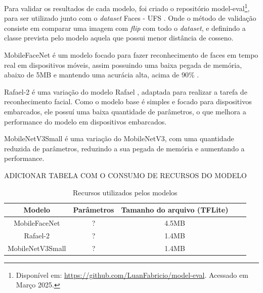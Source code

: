 Para validar os resultados de cada modelo, foi criado o repositório model-eval\footnote{
Disponível em: \url{https://github.com/LuanFabricio/model-eval}. Acessado em Março 2025.}, para ser utilizado junto com o
\textit{dataset} Faces - UFS \cite{leandro}.
Onde o método de validação consiste em comparar uma imagem com \textit{flip} com todo o \textit{dataset}, e definindo
a classe prevista pelo modelo aquela que possui menor distância de cosseno.

MobileFaceNet é um modelo focado para fazer reconhecimento de faces em tempo real em dispositivos móveis,
assim possuindo uma baixa pegada de memória, abaixo de 5MB e mantendo uma acurácia alta, acima de 90\% \cite{leandro}.

Rafael-2 é uma variação do modelo Rafael \cite{rafael}, adaptada para realizar a tarefa de reconhecimento facial.
Como o modelo base é simples e focado para dispositivos embarcados, ele possuí uma baixa quantidade de parâmetros,
 o que melhora a performance do modelo em dispositivos embarcados.

MobileNetV3Small é uma variação do MobileNetV3, com uma quantidade reduzida de parâmetros, reduzindo a sua pegada de
memória e aumentando a performance.

ADICIONAR TABELA COM O CONSUMO DE RECURSOS DO MODELO
\begin{center}
\begin{table}[htb]
\centering
\ABNTEXfontereduzida
\caption[Recursos utilizados pelos modelos]{Recursos utilizados pelos modelos}
\label{tabela_acuracia_1}
\begin{tabular}{ |c|c|c|c|c| }
	\hline
	\textbf{Modelo} & \textbf{Parâmetros} & \textbf{Tamanho do arquivo (TFLite)} \\
	\hline
	MobileFaceNet 		& ? 	& 4.5MB \\
	Rafael-2 		& ? 	& 1.4MB \\
	MobileNetV3Small 	& ? 	& 1.4MB \\
	\hline
\end{tabular}
\end{table}
\end{center}

